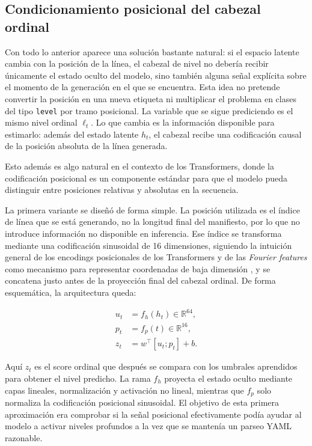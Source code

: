 \subsection{Condicionamiento posicional del cabezal ordinal}
\label{sec:ch6_positional_encoder}

Con todo lo anterior aparece una solución bastante natural: si el espacio latente cambia con la posición de la línea, el cabezal de nivel no debería recibir únicamente el
estado oculto del modelo, sino también alguna señal explícita sobre el momento de la generación en el que se encuentra. Esta idea no pretende convertir la posición en una nueva
etiqueta ni multiplicar el problema en clases del tipo \texttt{level} por tramo posicional. La variable que se sigue prediciendo es el mismo nivel ordinal $\ell_t$. Lo que cambia es
la información disponible para estimarlo: además del estado latente $h_t$, el cabezal recibe una codificación causal de la posición absoluta de la línea generada.

Esto además es algo natural en el contexto de los Transformers, donde la codificación posicional es un componente estándar para que el modelo pueda distinguir entre posiciones
relativas y absolutas en la secuencia.

La primera variante se diseñó de forma simple. La posición utilizada es el índice de línea que se está generando, no la longitud final del manifiesto, por lo
que no introduce información no disponible en inferencia. Ese índice se transforma mediante una codificación sinusoidal de 16 dimensiones, siguiendo la intuición general de los
encodings posicionales de los Transformers y de las \textit{Fourier features} como mecanismo para representar coordenadas de baja dimensión \citep{vaswani2017attention, tancik2020fourierFeatures}, y
se concatena justo antes de la proyección final del cabezal ordinal. De forma esquemática, la arquitectura
queda:

\[
\begin{aligned}
u_t &= f_h(h_t) \in \mathbb{R}^{64},\\
p_t &= f_p(t) \in \mathbb{R}^{16},\\
z_t &= w^\top [u_t; p_t] + b.
\end{aligned}
\]

Aquí $z_t$ es el score ordinal que después se compara con los umbrales aprendidos para obtener el nivel predicho. La rama $f_h$ proyecta el estado oculto mediante capas lineales,
normalización y activación no lineal, mientras que $f_p$ solo normaliza la codificación posicional sinusoidal. El objetivo de esta primera aproximación era comprobar si la señal
posicional efectivamente podía ayudar al modelo a activar niveles profundos a la vez que se mantenía un parseo YAML razonable.

